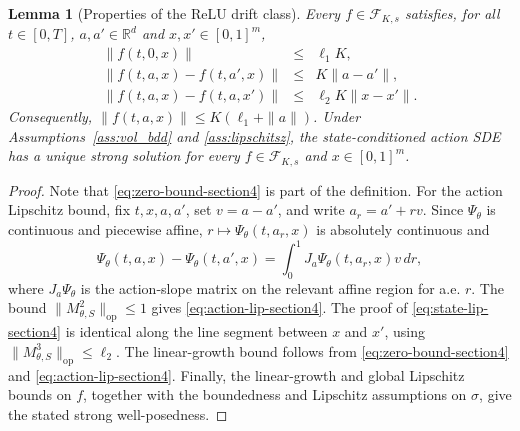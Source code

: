 \documentclass{article}
\newtheorem{lem}[thm]{Lemma}
\newcommand{\1}{\mathbbm{1}}
\numberwithin{equation}{section}
\def\sR{{\mathbb R}}
\begin{document}
\begin{lem}[Properties of the ReLU drift class]
\label{lem:basic-relu-class}
Every \(f\in\mathcal F_{K,s}\) satisfies, for all $t\in [0,T]$, 
$a,a'\in \sR^d$ and $x,x'\in [0,1]^m$,
\begin{eqnarray}
 \|f(t,0,x)\|&\le& \ell_1K,\label{eq:zero-bound-section4}\\
 \|f(t,a,x)-f(t,a',x)\|&\le& K\|a-a'\|,\label{eq:action-lip-section4}\\
 \|f(t,a,x)-f(t,a,x')\|&\le& \ell_2K\|x-x'\|.
\label{eq:state-lip-section4}
\end{eqnarray}
Consequently, \(\|f(t,a,x)\|\le K(\ell_1+\|a\|)\). Under Assumptions~\ref{ass:vol_bdd} and \ref{ass:lipschitsz}, the state-conditioned action SDE has a unique strong solution for every \(f\in\mathcal F_{K,s}\) and \(x\in[0,1]^m\).
\end{lem}

\begin{proof}
Note that \eqref{eq:zero-bound-section4} is part of the definition. For the action Lipschitz bound, fix \(t,x,a,a'\), set \(v=a-a'\), and write \(a_r=a'+rv\). Since \(\Psi_\theta\) is continuous and piecewise affine, \(r\mapsto\Psi_\theta(t,a_r,x)\) is absolutely continuous and
\[
 \Psi_\theta(t,a,x)-\Psi_\theta(t,a',x)
 =\int_0^1 J_a\Psi_\theta(t,a_r,x)v\,dr,
\]
where \(J_a\Psi_\theta\) is the action-slope matrix on the relevant affine region for a.e. \(r\). The bound \(\|M^2_{\theta,S}\|_{\mathrm{op}}\le1\) gives \eqref{eq:action-lip-section4}. The proof of \eqref{eq:state-lip-section4} is identical along the line segment between \(x\) and \(x'\), using \(\|M^3_{\theta,S}\|_{\mathrm{op}}\le\ell_2\). The linear-growth bound follows from \eqref{eq:zero-bound-section4} and \eqref{eq:action-lip-section4}. Finally, the linear-growth and global Lipschitz bounds on \(f\), together with the boundedness and Lipschitz assumptions on \(\sigma\), give the stated strong well-posedness.
\end{proof}
\end{document}
